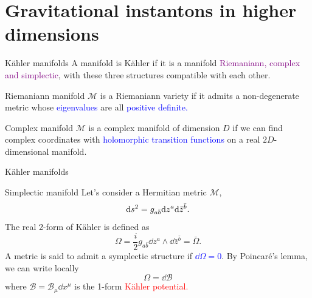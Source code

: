 \documentclass[aspectratio=169,xcolor=dvipsnames]{beamer}
\begin{document}
\section{Gravitational instantons in higher dimensions}\justifying
\begin{frame}{K\"ahler manifolds}
A manifold is K\"ahler if it is a manifold \textcolor{purple}{Riemaniann, complex and simplectic}, with these three structures compatible with each other.

\begin{block}{Riemaniann manifold}
    $\mathcal{M}$ is a Riemaniann variety if it admits a non-degenerate metric whose \textcolor{blue}{eigenvalues} are all \textcolor{blue}{positive definite.}
\end{block}
    \begin{block}{Complex manifold}
    $\mathcal{M}$ is a complex manifold of dimension $D$ if we can find complex coordinates with \textcolor{blue}{holomorphic transition functions} on a real $2D$-dimensional manifold.
    \end{block}
\end{frame}

\begin{frame}{K\"ahler manifolds}\justifying
{}
    \begin{block}{Simplectic manifold}
        Let's consider a Hermitian metric $\mathcal{M}$,
        \begin{equation*}
            \dd s^2=g_{a\bar{b}}\dd z^{a}\dd\Bar{z}^{\Bar{b}}.
        \end{equation*}
        The real 2-form of K\"ahler is defined as
        \begin{equation*}
            \Omega=\frac{i}{2}g_{a\bar{b}}\dd z^{a}\wedge \dd\bar{z}^{\bar{b}}=\bar{\Omega}.
        \end{equation*}
        A metric is said to admit a symplectic structure if \textcolor{blue}{$\dd\Omega=0$}.
By Poincaré's lemma, we can write locally
\begin{equation*}
    \Omega=\dd \mathcal{B}
\end{equation*}
where $\mathcal{B}=\mathcal{B}_\mu\dd x^\mu$ is the 1-form \textcolor{red}{K\"ahler potential.}
    \end{block}
\end{frame}
\end{document}

